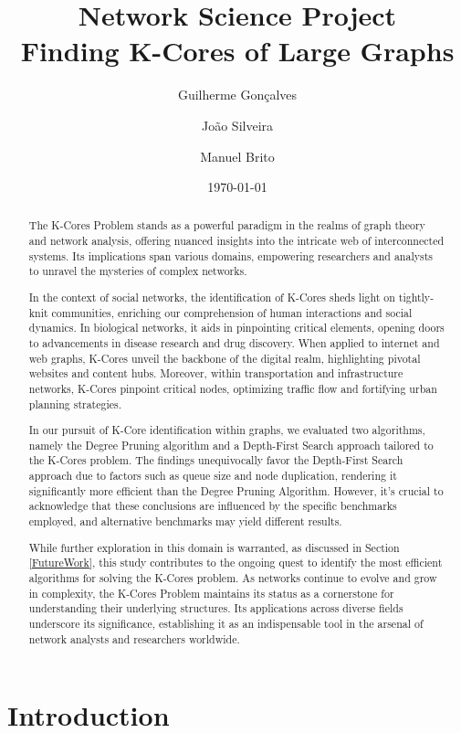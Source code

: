 \documentclass[a4paper, 11pt]{article}
\title{Network Science Project \\ \textbf{Finding K-Cores of Large Graphs}}
\author{Guilherme Gonçalves \and João Silveira \and Manuel Brito}
\date{\today}
\begin{document}
\maketitle
\begin{abstract}
The K-Cores Problem stands as a powerful paradigm in the realms of graph theory and network analysis, offering nuanced insights into the intricate web of interconnected systems. Its implications span various domains, empowering researchers and analysts to unravel the mysteries of complex networks.

In the context of social networks, the identification of K-Cores sheds light on tightly-knit communities, enriching our comprehension of human interactions and social dynamics. In biological networks, it aids in pinpointing critical elements, opening doors to advancements in disease research and drug discovery. When applied to internet and web graphs, K-Cores unveil the backbone of the digital realm, highlighting pivotal websites and content hubs. Moreover, within transportation and infrastructure networks, K-Cores pinpoint critical nodes, optimizing traffic flow and fortifying urban planning strategies.

In our pursuit of K-Core identification within graphs, we evaluated two algorithms, namely the Degree Pruning algorithm and a Depth-First Search approach tailored to the K-Cores problem. The findings unequivocally favor the Depth-First Search approach due to factors such as queue size and node duplication, rendering it significantly more efficient than the Degree Pruning Algorithm. However, it's crucial to acknowledge that these conclusions are influenced by the specific benchmarks employed, and alternative benchmarks may yield different results.

While further exploration in this domain is warranted, as discussed in Section \ref{FutureWork}, this study contributes to the ongoing quest to identify the most efficient algorithms for solving the K-Cores problem. As networks continue to evolve and grow in complexity, the K-Cores Problem maintains its status as a cornerstone for understanding their underlying structures. Its applications across diverse fields underscore its significance, establishing it as an indispensable tool in the arsenal of network analysts and researchers worldwide.
\end{abstract}


\clearpage
\tableofcontents
\clearpage


\section{Introduction}

\end{document}
